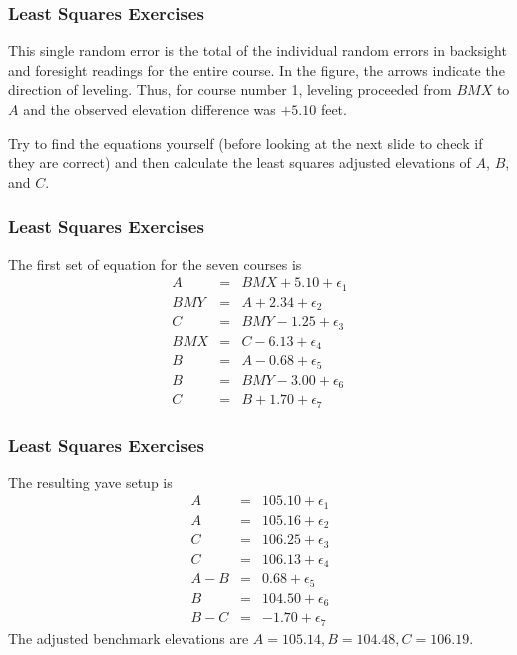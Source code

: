 \documentclass[xcolor=dvipsnames]{beamer}
\begin{document}
\begin{frame}
  \frametitle{Least Squares Exercises}
  This single random error is the total of the individual random
  errors in backsight and foresight readings for the entire course. In
  the figure, the arrows indicate the direction of leveling. Thus, for
  course number 1, leveling proceeded from $BMX$ to $A$ and the observed
  elevation difference was $+5.10$ feet.

\bigskip

  Try to find the equations yourself (before looking at the next slide
  to check if they are correct) and then calculate the least squares
  adjusted elevations of $A$, $B$, and $C$.
\end{frame}

\begin{frame}
  \frametitle{Least Squares Exercises}
  The first set of equation for the seven courses is
  \begin{equation}
    \label{eq:aelaeghu}
    \begin{array}{rcl}
      A&=&BMX+5.10+\epsilon_{1} \\
      BMY&=&A+2.34+\epsilon_{2} \\
      C&=&BMY-1.25+\epsilon_{3} \\
      BMX&=&C-6.13+\epsilon_{4} \\
      B&=&A-0.68+\epsilon_{5} \\
      B&=&BMY-3.00+\epsilon_{6} \\
      C&=&B+1.70+\epsilon_{7}
    \end{array}
  \end{equation}
\end{frame}

\begin{frame}
  \frametitle{Least Squares Exercises}
  The resulting yave setup is
  \begin{equation}
    \label{eq:beephaht}
    \begin{array}{rcl}
      A&=&105.10+\epsilon_{1} \\
      A&=&105.16+\epsilon_{2} \\
      C&=&106.25+\epsilon_{3} \\
      C&=&106.13+\epsilon_{4} \\
      A-B&=&0.68+\epsilon_{5} \\
      B&=&104.50+\epsilon_{6} \\
      B-C&=&-1.70+\epsilon_{7}
    \end{array}
  \end{equation}
The adjusted benchmark elevations are $A=105.14,B=104.48,C=106.19$.
\end{frame}
\end{document}
